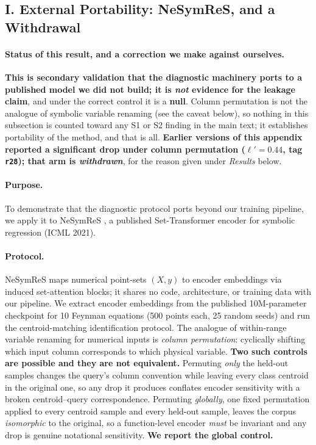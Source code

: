\subsection*{I. External Portability: NeSymReS, and a Withdrawal}

\paragraph{Status of this result, and a correction we make against ourselves.} \textbf{This is secondary validation that the diagnostic machinery ports to a published model we did not build; it is \emph{not} evidence for the leakage claim}, and under the correct control it is a \textbf{null}. Column permutation is not the analogue of symbolic variable renaming (see the caveat below), so nothing in this subsection is counted toward any S1 or S2 finding in the main text; it establishes portability of the method, and that is all. \textbf{Earlier versions of this appendix reported a significant drop under column permutation ($\ell'{=}0.44$, tag \texttt{r28}); that arm is \emph{withdrawn}}, for the reason given under \emph{Results} below.

\paragraph{Purpose.} To demonstrate that the diagnostic protocol ports beyond our training pipeline, we apply it to NeSymReS \citep{biggio2021neural}, a published Set-Transformer encoder for symbolic regression (ICML 2021).

\paragraph{Protocol.} NeSymReS maps numerical point-sets $(X, y)$ to encoder embeddings via induced set-attention blocks; it shares no code, architecture, or training data with our pipeline.  We extract encoder embeddings from the published 10M-parameter checkpoint for 10 Feynman equations (500 points each, 25 random seeds) and run the centroid-matching identification protocol.  The analogue of within-range variable renaming for numerical inputs is \emph{column permutation}: cyclically shifting which input column corresponds to which physical variable. \textbf{Two such controls are possible and they are not equivalent.} Permuting \emph{only} the held-out samples changes the query's column convention while leaving every class centroid in the original one, so any drop it produces conflates encoder sensitivity with a broken centroid--query correspondence. Permuting \emph{globally}, one fixed permutation applied to every centroid sample and every held-out sample, leaves the corpus \emph{isomorphic} to the original, so a function-level encoder \emph{must} be invariant and any drop is genuine notational sensitivity. \textbf{We report the global control.}

